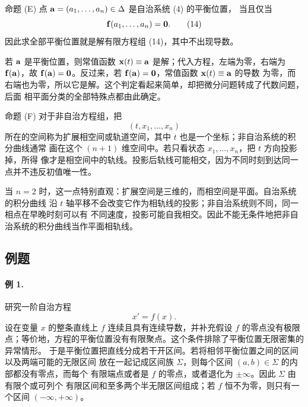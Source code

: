 \begin{sourceitem}{命题 (E)}
点 \(\vect{a}=(a_1,\ldots,a_n)\in\Delta\) 是自治系统 (4) 的平衡位置，
当且仅当
\begin{equation}
 \vect{f}(a_1,\ldots,a_n)=\vect{0}.
 \tag{14}
\end{equation}
因此求全部平衡位置就是解有限方程组 (14)，其中不出现导数。
\end{sourceitem}

若 \(\vect{a}\) 是平衡位置，则常值函数 \(\vect{x}(t)\equiv \vect{a}\) 是解；代入方程，左端为零，右端为
\(\vect{f}(\vect{a})\)，故 \(\vect{f}(\vect{a})=\vect{0}\)。反过来，若 \(\vect{f}(\vect{a})=\vect{0}\)，常值函数 \(\vect{x}(t)\equiv \vect{a}\) 的导数
为零，而右端也为零，所以它是解。这个判定看起来简单，却把微分问题转成了代数问题，后面
相平面分类的全部特殊点都由此确定。

\begin{sourceitem}{命题 (F)}
对于非自治方程组，把
\[
 (t,x_1,\ldots,x_n)
\]
所在的空间称为扩展相空间或轨道空间，其中 \(t\) 也是一个坐标；非自治系统的积分曲线通常
画在这个 \((n+1)\) 维空间中。若只看状态 \(x_1,\ldots,x_n\)，把 \(t\) 方向投影掉，所得
像才是相空间中的轨线。投影后轨线可能相交，因为不同时刻到达同一点并不违反初值唯一性。
\end{sourceitem}

当 \(n=2\) 时，这一点特别直观：扩展空间是三维的，而相空间是平面。自治系统的积分曲线
沿 \(t\) 轴平移不会改变它作为相轨线的投影；非自治系统则不同，同一相点在早晚时刻可以有
不同速度，投影可能自我相交。因此不能无条件地把非自治系统的积分曲线当作平面相轨线。

\subsection*{例题}

\paragraph{例 1.}
研究一阶自治方程
\begin{equation}
 x'=f(x).
 \tag{15}
\end{equation}
设在变量 \(x\) 的整条直线上 \(f\) 连续且具有连续导数，并补充假设 \(f\) 的零点没有极限
点；等价地，方程的平衡位置没有有限聚点。这个条件排除了平衡位置无限密集的异常情形。
于是平衡位置把直线分成若干开区间。若将相邻平衡位置之间的区间以及两端可能的无限区间
放在一起记成区间族 \(\Sigma\)，则每个区间 \((a,b)\in\Sigma\) 的内部都没有零点，而每个
有限端点或者是 \(f\) 的零点，或者退化为 \(\pm\infty\)。因此 \(\Sigma\) 由有限个或可列个
有限区间和至多两个半无限区间组成；若 \(f\) 恒不为零，则只有一个区间
\((-\infty,+\infty)\)。

